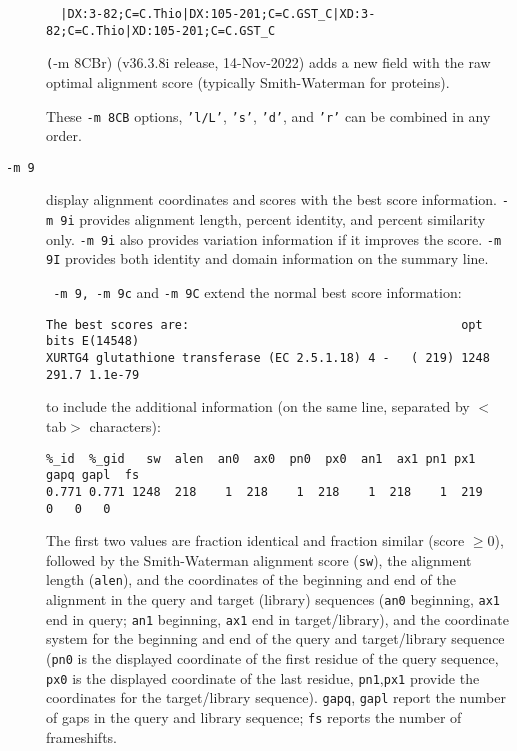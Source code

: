 \documentclass[11pt]{article}
\begin{document}
\begin{description}
\begin{verbatim}
  |DX:3-82;C=C.Thio|DX:105-201;C=C.GST_C|XD:3-82;C=C.Thio|XD:105-201;C=C.GST_C
\end{verbatim}

  \texttt(-m 8CBr) (v36.3.8i release, 14-Nov-2022) adds a new field with the raw optimal alignment score (typically Smith-Waterman for proteins).

  These \texttt{-m 8CB} options, \texttt{'l/L'}, \texttt{'s'}, \texttt{'d'}, and \texttt{'r'} can be combined in any order.

\item[\texttt{-m 9}] display alignment coordinates and scores with the
  best score information.  \texttt{-m 9i} provides alignment length,
  percent identity, and percent similarity only. \texttt{-m 9i} also
  provides variation information if it improves the score. \texttt{-m
    9I} provides both identity and domain information on the summary
  line.

 \texttt{ -m 9, -m 9c} and \texttt{-m 9C} extend the normal best score information:
\begin{footnotesize}
\begin{verbatim}
The best scores are:                                      opt bits E(14548)
XURTG4 glutathione transferase (EC 2.5.1.18) 4 -   ( 219) 1248 291.7 1.1e-79
\end{verbatim}
\end{footnotesize}

to include the additional information (on the same line, separated by
$<$tab$>$ characters):
\begin{footnotesize}
\begin{verbatim}
%_id  %_gid   sw  alen  an0  ax0  pn0  px0  an1  ax1 pn1 px1 gapq gapl  fs
0.771 0.771 1248  218    1  218    1  218    1  218    1  219   0   0   0
\end{verbatim}
\end{footnotesize}

The first two values are fraction identical and fraction similar
(score $\ge 0$), followed by the Smith-Waterman alignment score (\texttt{sw}), the
alignment length (\texttt{alen}), and the coordinates of the beginning
and end of the alignment in the query and target (library) sequences
(\texttt{an0} beginning, \texttt{ax1} end in query; \texttt{an1}
beginning, \texttt{ax1} end in target/library), and the coordinate
system for the beginning and end of the query and target/library
sequence (\texttt{pn0} is the displayed coordinate of the first
residue of the query sequence, \texttt{px0} is the displayed
coordinate of the last residue, \texttt{pn1},\texttt{px1} provide the
coordinates for the target/library sequence). \texttt{gapq},
\texttt{gapl} report the number of gaps in the query and library
sequence; \texttt{fs} reports the number of frameshifts.


\end{description}
\end{document}
